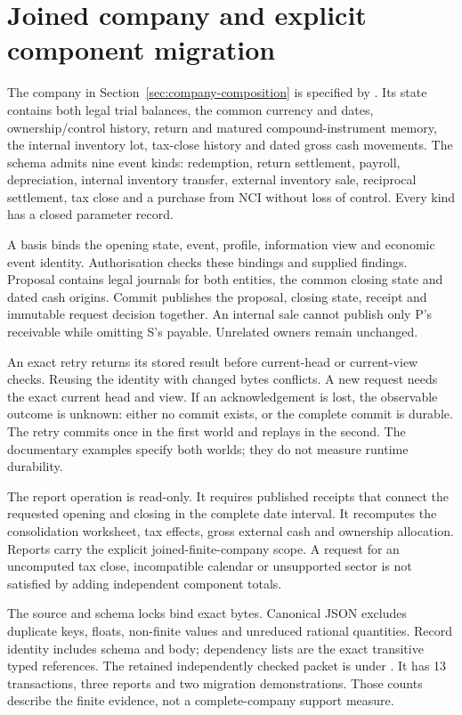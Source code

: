 \section{Joined company and explicit component migration}
\label{sec:company-composition-reference}

The company in Section~\ref{sec:company-composition} is specified by
. Its state contains both legal trial balances,
the common currency and dates, ownership/control history, return and matured
compound-instrument memory, the internal inventory lot, tax-close history and
dated gross cash movements. The schema admits nine event kinds: redemption,
return settlement, payroll, depreciation, internal inventory transfer,
external inventory sale, reciprocal settlement, tax close and a purchase from
NCI without loss of control. Every kind has a closed parameter record.

A basis binds the opening state, event, profile, information view and economic
event identity. Authorisation checks these bindings and supplied findings.
Proposal contains legal journals for both entities, the common closing state
and dated cash origins. Commit publishes the proposal, closing state, receipt
and immutable request decision together. An internal sale cannot publish only
P's receivable while omitting S's payable. Unrelated owners remain unchanged.

An exact retry returns its stored result before current-head or current-view
checks. Reusing the identity with changed bytes conflicts. A new request needs
the exact current head and view. If an acknowledgement is lost, the observable
outcome is unknown: either no commit exists, or the complete commit is durable.
The retry commits once in the first world and replays in the second. The
documentary examples specify both worlds; they do not measure runtime durability.

The report operation is read-only. It requires published receipts that connect
the requested opening and closing in the complete date interval. It recomputes
the consolidation worksheet, tax effects, gross external cash and ownership
allocation. Reports carry the explicit joined-finite-company scope. A request
for an uncomputed tax close, incompatible calendar or unsupported sector is
not satisfied by adding independent component totals.

The source and schema locks bind exact bytes. Canonical JSON excludes duplicate
keys, floats, non-finite values and unreduced rational quantities. Record
identity includes schema and body; dependency lists are the exact transitive
typed references. The retained independently checked packet is under
. It has
13 transactions, three reports and two migration demonstrations. Those counts
describe the finite evidence, not a complete-company support measure.

